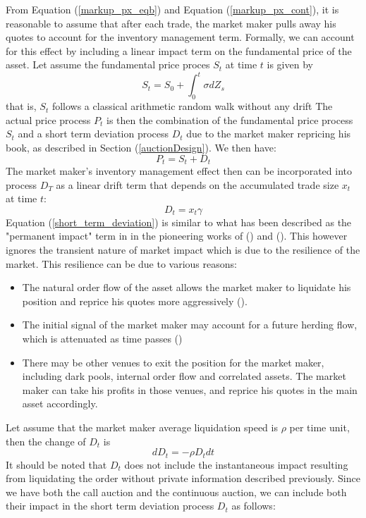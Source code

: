\documentclass{article}
\begin{document}
From Equation (\ref{markup_px_eqb}) and Equation (\ref{markup_px_cont}), it is reasonable to assume that after each trade, the market maker pulls away his quotes to account for the inventory management term. Formally, we can account for this effect by including a linear impact term on the fundamental price of the asset. Let assume the fundamental price proces $S_t$ at time $t$ is given by
\[
  S_t = S_0 + \int_0^t \sigma dZ_s
\]
that is, $S_t$ follows a classical arithmetic random walk without any drift The actual price process $P_t$ is then the combination of the fundamental price process $S_t$ and a short term deviation process $D_t$ due to the market maker repricing his book, as described in Section (\ref{auctionDesign}). We then have:
\[
  P_t = S_t + D_t
\]
The market maker's inventory management effect then can be incorporated into process $D_T$ as a linear drift term that depends on the accumulated trade size $x_t$ at time $t$:
\begin{equation}\label{short_term_deviation}
  D_t = x_t \gamma
\end{equation}
Equation (\ref{short_term_deviation}) is similar to what has been described as the "permanent impact" term in in the pioneering works of (\cite{BertimasLo1999}) and (\cite{AlmgrenChriss2000}). This however ignores the transient nature of market impact which is due to the resilience of the market. This resilience can be due to various reasons:
\begin{itemize}
  \item The natural order flow of the asset allows the market maker to liquidate his position and reprice his quotes more aggressively (\cite{Avellaneda2008}).
  \item The initial signal of the market maker may account for a future herding flow, which is attenuated as time passes (\cite{Thibault2015})
  \item There may be other venues to exit the position for the market maker, including dark pools, internal order flow and correlated assets. The market maker can take his profits in those venues, and reprice his quotes in the main asset accordingly.
\end{itemize}
Let assume that the market maker average liquidation speed is $\rho$ per time unit, then the change of $D_t$ is
\[
  dD_t = -\rho D_t dt
\]
It should be noted that $D_t$ does not include the instantaneous impact resulting from liquidating the order without private information described previously. Since we have both the call auction and the continuous auction, we can include both their impact in the short term deviation process $D_t$ as follows:
\end{document}
